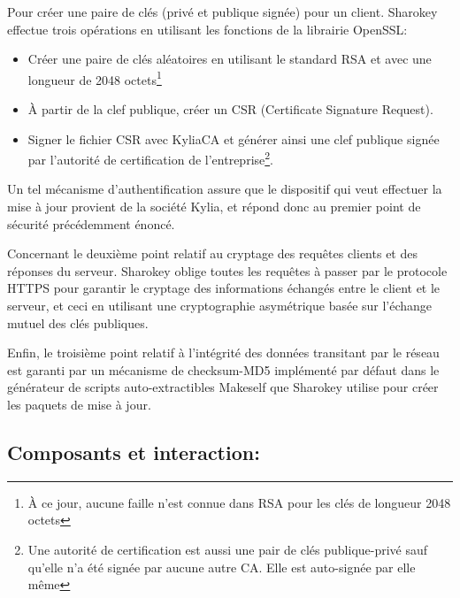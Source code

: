 \documentclass{themeensg}
\begin{document}
Pour créer une paire de clés (privé et publique signée) pour un client. Sharokey effectue trois opérations en utilisant les fonctions de la librairie OpenSSL:
\begin{itemize}
\item Créer une paire de clés aléatoires en utilisant le standard RSA et avec une longueur de 2048 octets\footnote{À ce jour, aucune faille n'est connue dans RSA pour les clés de longueur 2048 octets}
\item À partir de la clef publique, créer un CSR (Certificate Signature Request).
\item Signer le fichier CSR avec KyliaCA et générer ainsi une clef publique signée par l'autorité de certification de l'entreprise\footnote{Une autorité de certification est aussi une pair de clés publique-privé sauf qu'elle n'a été signée par aucune autre CA. Elle est auto-signée par elle même}.
\end{itemize}
Un tel mécanisme d'authentification assure que le dispositif qui veut effectuer la mise à jour provient de la société Kylia, et répond donc au premier point de sécurité précédemment énoncé.

Concernant le deuxième point relatif au cryptage des requêtes clients et des réponses du serveur. Sharokey oblige toutes les requêtes à passer par le protocole HTTPS pour garantir le cryptage des informations échangés entre le client et le serveur, et ceci en utilisant une cryptographie asymétrique basée sur l'échange mutuel des clés publiques.

Enfin, le troisième point relatif à l'intégrité des données transitant par le réseau est garanti par un mécanisme de checksum-MD5 implémenté par défaut dans le générateur de scripts auto-extractibles Makeself que Sharokey utilise pour créer les paquets de mise à jour.

\subsection{Composants et interaction:}
\end{document}
